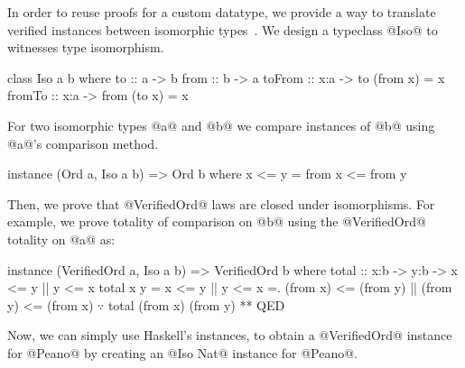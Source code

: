 %
In order to reuse proofs for a custom datatype,
we provide a way to translate verified instances between isomorphic types~\cite{barthe2001type}.
%
We design a typeclass @Iso@ to witnesses type isomorphism.
%
\begin{mcode}
    class Iso a b where
      to     :: a -> b
      from   :: b -> a
      toFrom :: x:a -> {to (from x) = x}
      fromTo :: x:a -> {from (to x) = x}
\end{mcode}
%
For two isomorphic types @a@ and @b@
we compare instances of @b@ using @a@'s
comparison method.
%
\begin{mcode}
    instance (Ord a, Iso a b) => Ord b where
      x <= y = from x <= from y
\end{mcode}
%
Then, we prove that @VerifiedOrd@ laws are closed under isomorphisms.
%
For example, we prove totality of comparison on @b@
using the @VerifiedOrd@ totality on @a@ as:
%
\begin{mcode}
    instance (VerifiedOrd a, Iso a b) => VerifiedOrd b where
      total :: x:b -> y:b -> {x <= y || y <= x}
      total x y =  x <= y || y <= x
                =. (from x) <= (from y) || (from y) <= (from x)
                $\because$ total (from x) (from y) ** QED
\end{mcode}
%
Now, we can simply use Haskell's instances,
to obtain a @VerifiedOrd@ instance for @Peano@
by creating an @Iso Nat@ instance for @Peano@.

